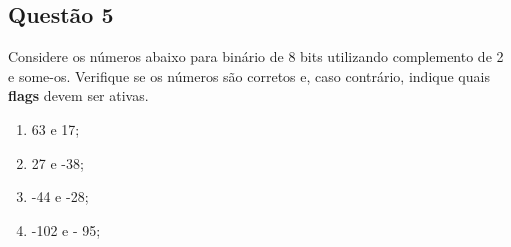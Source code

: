 \documentclass{article}
\begin{document}
\newpage

        \subsection{Questão 5}
            \begin{exercise}
                Considere os números abaixo para binário de 8 bits utilizando complemento de 2 e some-os. Verifique se os números são corretos e, caso contrário, indique quais \textbf{flags} devem ser ativas.
                \begin{enumerate}[noitemsep]
                    \item 63 e 17;
                    \item 27 e -38;
                    \item -44 e -28;
                    \item -102 e - 95;
                \end{enumerate}
            \end{exercise}
\end{document}
